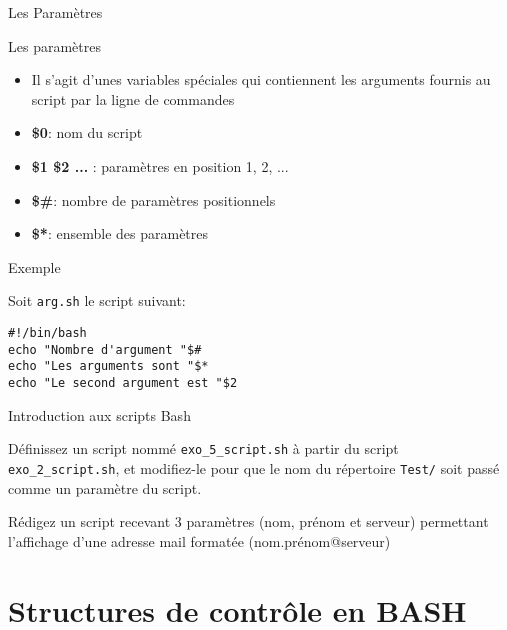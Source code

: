 \begin{frame}[fragile]{Les Paramètres}
  \begin{block}{Les paramètres}
    \begin{itemize}
    \item Il s'agit d'unes variables spéciales qui contiennent les arguments fournis au script par la ligne de commandes
    \item \textbf{\$0}: nom du script
    \item \textbf{\$1 \$2 ... }: paramètres en position 1, 2, ...
    \item \textbf{\$\#}: nombre de paramètres positionnels
    \item \textbf{\$*}: ensemble des paramètres
    \end{itemize}
  \end{block}

  \begin{block}{Exemple}
    \small{
      Soit \texttt{arg.sh} le script suivant:
\begin{verbatim}
#!/bin/bash
echo "Nombre d'argument "$#
echo "Les arguments sont "$*
echo "Le second argument est "$2
\end{verbatim}
      \vspace{0.1cm}
    }
  \end{block}
  
\end{frame}

\begin{exercice}
  \begin{exercicelet}{Introduction aux scripts Bash}
    \begin{questions}
    \item Définissez un script nommé \texttt{exo\_5\_script.sh} à partir du script \texttt{exo\_2\_script.sh}, et modifiez-le pour que le nom du répertoire \texttt{Test/} soit passé comme un paramètre du script.
    \item Rédigez un script recevant 3 paramètres (nom, prénom et serveur) permettant l'affichage d'une adresse mail formatée (nom.prénom@serveur)

    \end{questions}
  \end{exercicelet}
\end{exercice}

\section{Structures de contrôle en BASH}
